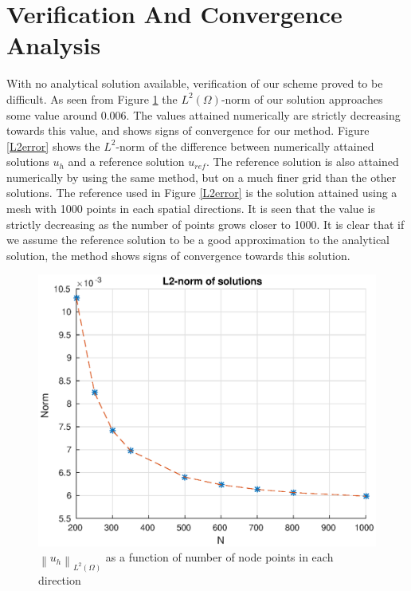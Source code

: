 \documentclass[10pt,a4paper]{article}
\newcommand{\vectornorm}[1]{\left\|#1\right\|}
\begin{document}
\section*{Verification And Convergence Analysis}
With no analytical solution available, verification of our scheme proved to be difficult. As seen from Figure \ref{L2sol} the $L^2(\Omega)$-norm of our solution approaches some value around 0.006. The values attained numerically are strictly decreasing towards this value, and shows signs of convergence for our method. Figure \ref{L2error} shows the $L^2$-norm of the difference between numerically attained solutions $u_h$ and a reference solution $u_{ref}$. The reference solution is also attained numerically by using the same method, but on a much finer grid than the other solutions. The reference used in Figure \ref{L2error} is the solution attained using a mesh with 1000 points in each spatial directions. It is seen that the value is strictly decreasing as the number of points grows closer to 1000. It is clear that if we assume the reference solution to be a good approximation to the analytical solution, the method shows signs of convergence towards this solution.
\begin{figure}
    \centering
    \includegraphics[scale=0.8]{figures/L2solutions}
    \caption{$\vectornorm{u_h}_{L^2(\Omega)}$ as a function of number of node points in each direction}
    \label{L2sol}
\end{figure} 
\end{document}
